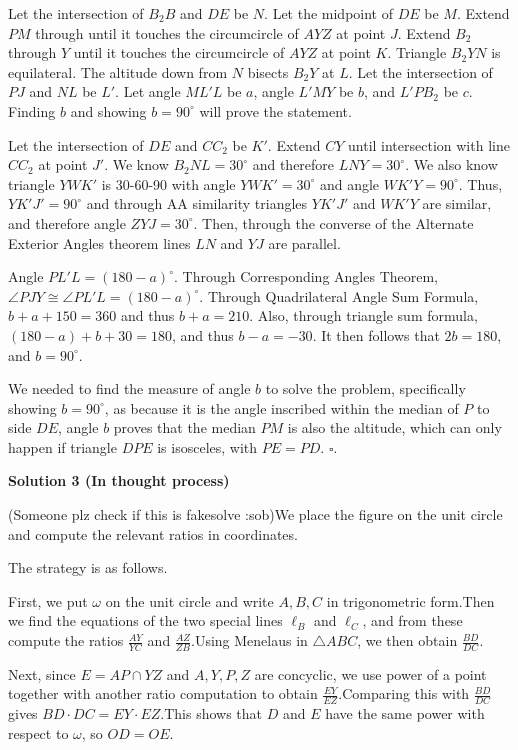 \begin{enumerate}
 Let the intersection of $B_2B$ and $DE$ be $N$. Let the midpoint of $DE$ be $M$. Extend $PM$ through until it touches the circumcircle of $AYZ$ at point $J$. Extend $B_2$ through $Y$ until it touches the circumcircle of $AYZ$ at point $K$. Triangle $B_2YN$ is equilateral. The altitude down from $N$ bisects $B_2Y$ at $L$. Let the intersection of $PJ$ and $NL$ be $L'$. Let angle $ML'L$ be $a$, angle $L'MY$ be $b$, and $L'PB_2$ be $c$. Finding $b$ and showing $b = 90^\circ$ will prove the statement.

 Let the intersection of $DE$ and $CC_2$ be $K'$. Extend $CY$ until intersection with line $CC_2$ at point $J'$. We know $B_2NL = 30^\circ$ and therefore $LNY = 30^\circ$. We also know triangle $YWK'$ is 30-60-90 with angle $YWK' = 30^\circ$ and angle $WK'Y = 90^\circ$. Thus, $YK'J' = 90^\circ$ and through AA similarity triangles $YK'J'$ and $WK'Y$ are similar, and therefore angle $ZYJ = 30^\circ$. Then, through the converse of the Alternate Exterior Angles theorem lines $LN$ and $YJ$ are parallel. 

 Angle $PL'L = (180-a)^\circ$. Through Corresponding Angles Theorem, $\angle PJY \cong \angle PL'L = (180-a)^\circ$. Through Quadrilateral Angle Sum Formula, $b+a+150 = 360$ and thus $b+a = 210$. Also, through triangle sum formula, $(180-a)+b+30 = 180$, and thus $b-a = -30$. It then follows that $2b = 180$, and $b = 90^\circ$.

 We needed to find the measure of angle $b$ to solve the problem, specifically showing $b = 90^\circ$, as because it is the angle inscribed within the median of $P$ to side $DE$, angle $b$ proves that the median $PM$ is also the altitude, which can only happen if triangle $DPE$ is isosceles, with $PE = PD$. $\square$.

 



\textbf{Solution 3 (In thought process)}

(Someone plz check if this is fakesolve :sob)We place the figure on the unit circle and compute the relevant ratios in coordinates.

 The strategy is as follows.

 First, we put $\omega$ on the unit circle and write $A,B,C$ in trigonometric form.Then we find the equations of the two special lines $\ell_B$ and $\ell_C$, and from these compute the ratios $\frac{AY}{YC}$ and $\frac{AZ}{ZB}$.Using Menelaus in $\triangle ABC$, we then obtain $\frac{BD}{DC}$.

 Next, since $E=AP\cap YZ$ and $A,Y,P,Z$ are concyclic, we use power of a point together with another ratio computation to obtain $\frac{EY}{EZ}$.Comparing this with $\frac{BD}{DC}$ gives $BD\cdot DC=EY\cdot EZ$.This shows that $D$ and $E$ have the same power with respect to $\omega$, so $OD=OE$.


\end{enumerate}
